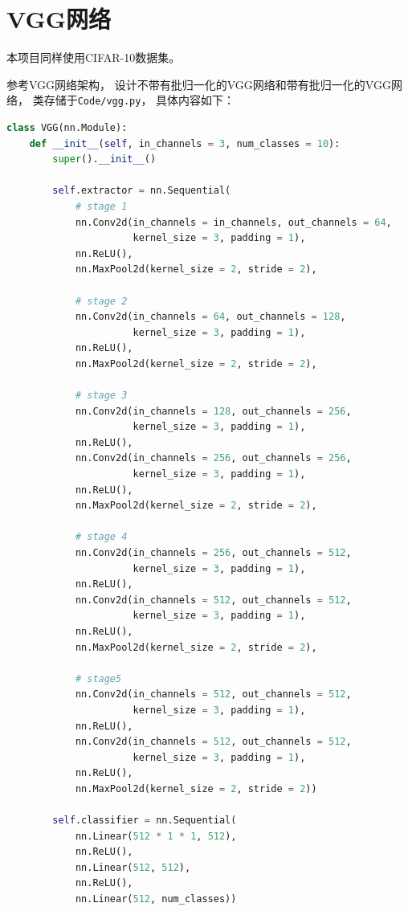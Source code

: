 \documentclass{article}
\begin{document}
\section{VGG网络}

本项目同样使用CIFAR-10数据集。

参考VGG网络架构，
设计不带有批归一化的VGG网络和带有批归一化的VGG网络，
类存储于\verb|Code/vgg.py|，
具体内容如下：

\begin{lstlisting}[language=python]
class VGG(nn.Module):
    def __init__(self, in_channels = 3, num_classes = 10):
        super().__init__()

        self.extractor = nn.Sequential(
            # stage 1
            nn.Conv2d(in_channels = in_channels, out_channels = 64, 
                      kernel_size = 3, padding = 1),
            nn.ReLU(),
            nn.MaxPool2d(kernel_size = 2, stride = 2),

            # stage 2
            nn.Conv2d(in_channels = 64, out_channels = 128, 
                      kernel_size = 3, padding = 1),
            nn.ReLU(),
            nn.MaxPool2d(kernel_size = 2, stride = 2),

            # stage 3
            nn.Conv2d(in_channels = 128, out_channels = 256, 
                      kernel_size = 3, padding = 1),
            nn.ReLU(),
            nn.Conv2d(in_channels = 256, out_channels = 256, 
                      kernel_size = 3, padding = 1),
            nn.ReLU(),
            nn.MaxPool2d(kernel_size = 2, stride = 2),

            # stage 4
            nn.Conv2d(in_channels = 256, out_channels = 512, 
                      kernel_size = 3, padding = 1),
            nn.ReLU(),
            nn.Conv2d(in_channels = 512, out_channels = 512, 
                      kernel_size = 3, padding = 1),
            nn.ReLU(),
            nn.MaxPool2d(kernel_size = 2, stride = 2),

            # stage5
            nn.Conv2d(in_channels = 512, out_channels = 512, 
                      kernel_size = 3, padding = 1),
            nn.ReLU(),
            nn.Conv2d(in_channels = 512, out_channels = 512, 
                      kernel_size = 3, padding = 1),
            nn.ReLU(),
            nn.MaxPool2d(kernel_size = 2, stride = 2))

        self.classifier = nn.Sequential(
            nn.Linear(512 * 1 * 1, 512),
            nn.ReLU(),
            nn.Linear(512, 512),
            nn.ReLU(),
            nn.Linear(512, num_classes))


\end{lstlisting}
\end{document}
